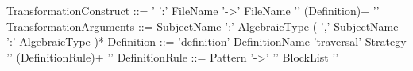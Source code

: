\begin{ebnf}[caption=Syntaxe concrète de la construction \lex{\%transformation}.,label=transformationConstructSyntax]
TransformationConstruct  ::= '%
                               ':' FileName '->' FileName '{' (Definition)+ '}'
TransformationArguments  ::= SubjectName ':' AlgebraicType ( ',' SubjectName ':' AlgebraicType )*
Definition                 ::= 'definition' DefinitionName 'traversal' Strategy '{' (DefinitionRule)+ '}'
DefinitionRule             ::= Pattern '->' '{' BlockList '}'
\end{ebnf}
